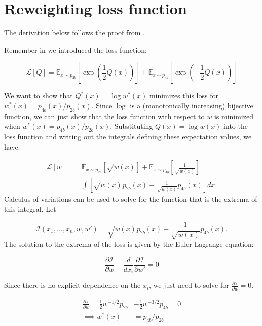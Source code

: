 \chapter{Reweighting loss function}
\label{rw-loss-fct}

The derivation below follows the proof from \cite{sean-thesis}.

Remember in \Ch{\ref{sec:rw-overview}} we introduced the loss function:

\begin{equation}
	\mathcal{L}[Q] = \mathbb{E}_{x\sim p_{2b}} \left[ \exp\left(  \frac{1}{2} Q(x) \right) \right] + \mathbb{E}_{x\sim p_{4b}} \left[ \exp\left(  - \frac{1}{2} Q(x) \right) \right]
\end{equation}

We want to show that $Q^*(x) = \log w^*(x) $ minimizes this loss for $w^*(x) = p_{4b}(x) / p_{2b}(x) $.
Since $\log$ is a (monotonically increasing) bijective function,
we can just show that the loss function with respect to $w$ is minimized when $w^*(x) = p_{4b}(x) / p_{2b}(x)$. Substituting $Q(x) = \log w(x)$ into the loss function and writing out the integrals defining these expectation values, we have: 

\begin{align}
	\mathcal{L}[w] &= \mathbb{E}_{x\sim p_{2b}} \left[ \sqrt{ w(x)} \right] + \mathbb{E}_{x\sim p_{4b}} \left[ \frac{1}{\sqrt{ w(x)}} \right] \\
	&= \int \left[ \sqrt{w(x)} p_{2b}(x) +\frac{1}{ \sqrt{w(x)} } p_{4b}(x) \right] dx.
\end{align}
\noindent
Calculus of variations can be used to solve for the function that is the extrema of this integral. Let

\begin{equation*}
\mathcal{I}( x_1 , \ldots , x_n, w, w' ) =  \sqrt{w(x)} p_{2b}(x) +\frac{1}{ \sqrt{w(x)} } p_{4b}(x).
\end{equation*}
\noindent
The solution to the extrema of the loss is given by the Euler-Lagrange equation:

\begin{equation*}
\frac{\partial \mathcal{I}}{\partial w} - \frac{d}{dx_i}  \frac{\partial \mathcal{I}}{\partial w'} = 0
\end{equation*}

\noindent
Since there is no explicit dependence on the $x_i$, we just need to solve for $\frac{\partial \mathcal{I}}{\partial w} =0$.

\begin{align*}
\frac{\partial \mathcal{I}}{\partial w} =  \frac{1}{2} w^{-1/2} p_{2b} &- \frac{1}{2} w^{-3/2} p_{4b} = 0 \\
\implies w^*(x) &= p_{4b} / p_{2b}
\end{align*}

